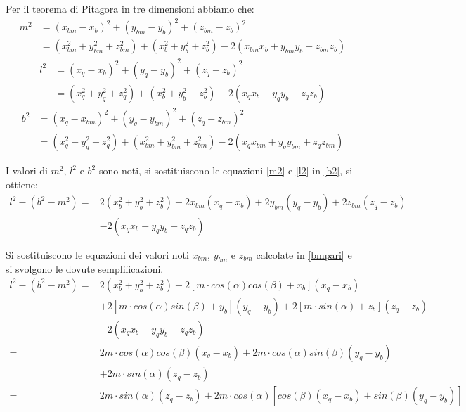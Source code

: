 \documentclass[11pt]{article}
\begin{document}
Per il teorema di Pitagora in tre dimensioni abbiamo che:
\begin{align}\label{m2}
    m^2 &= (x_{bm}-x_b)^2+(y_{bm}-y_b)^2+(z_{bm}-z_b)^2\\
    		&= (x_{bm}^2+y_{bm}^2+z_{bm}^2)+(x_{b}^2+y_{b}^2+z_{b}^2)-2(x_{bm}x_b+y_{bm}y_b+z_{bm}z_b)
\end{align}
\begin{align}\label{l2}
    l^2 &= (x_{q}-x_b)^2+(y_{q}-y_b)^2+(z_{q}-z_b)^2\\
    		&= (x_{q}^2+y_{q}^2+z_{q}^2)+(x_{b}^2+y_{b}^2+z_{b}^2)-2(x_{q}x_b+y_{q}y_b+z_{q}z_b)
\end{align}
\begin{align}\label{b2}
    b^2 &= (x_{q}-x_{bm})^2+(y_{q}-y_{bm})^2+(z_{q}-z_{bm})^2\\
    		&= (x_{q}^2+y_{q}^2+z_{q}^2)+(x_{bm}^2+y_{bm}^2+z_{bm}^2)-2(x_{q}x_{bm}+y_{q}y_{bm}+z_{q}z_{bm})
\end{align}

I valori di $m^2$, $l^2$ e $b^2$ sono noti, si sostituiscono le equazioni \eqref{m2} e \eqref{l2} in \eqref{b2}, si ottiene:
\begin{align}\label{passaggio}
    l^2-(b^2-m^2) =& 2(x_{b}^2+y_{b}^2+z_{b}^2)+2x_{bm}(x_q-x_b)+2y_{bm}(y_q-y_b)+2z_{bm}(z_q-z_b)\\ 
    				   & -2(x_qx_b+y_qy_b+z_qz_b)
\end{align}

Si sostituiscono le equazioni dei valori noti $x_{bm}$, $y_{bm}$ e $z_{bm}$ calcolate in \eqref{bmpari} e si svolgono le dovute semplificazioni.
\begin{align}\label{passaggio}
    l^2-(b^2-m^2) =& 2(x_{b}^2+y_{b}^2+z_{b}^2)+2[m \cdot cos(\alpha)cos(\beta)+x_b](x_q-x_b)\\
    &+2[m \cdot cos(\alpha)sin(\beta)+y_b](y_q-y_b)+2[m \cdot sin(\alpha)+z_b](z_q-z_b)\\ 
    				   & -2(x_qx_b+y_qy_b+z_qz_b)\\
    				   =& 2m \cdot cos(\alpha)cos(\beta)(x_q-x_b)+2m \cdot cos(\alpha)sin(\beta)(y_q-y_b)\\
    				   & +2m \cdot sin(\alpha)(z_q-z_b)\\
    				   =& 2m \cdot sin(\alpha)(z_q-z_b) +2m \cdot cos(\alpha)[cos(\beta)(x_q-x_b)+sin(\beta)(y_q-y_b)]   
\end{align}
\end{document}
